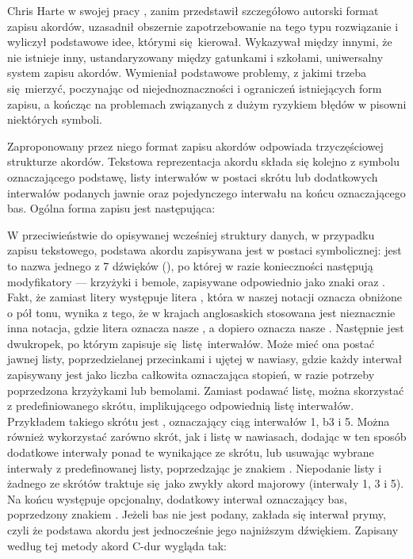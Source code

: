 Chris Harte w swojej pracy \cite{harte_towards_nodate}, zanim przedstawił szczegółowo autorski format zapisu akordów, uzasadnił obszernie zapotrzebowanie na tego typu rozwiązanie i wyliczył podstawowe idee, którymi się kierował. Wykazywał między innymi, że nie istnieje inny, ustandaryzowany między gatunkami i szkołami, uniwersalny system zapisu akordów.  Wymieniał podstawowe problemy, z jakimi trzeba się mierzyć, poczynając od niejednoznaczności i ograniczeń istniejących form zapisu, a kończąc na problemach związanych z dużym ryzykiem błędów w pisowni niektórych symboli.

Zaproponowany przez niego format zapisu akordów odpowiada trzyczęściowej strukturze akordów.  Tekstowa reprezentacja akordu składa się kolejno z symbolu oznaczającego podstawę, listy interwałów w postaci skrótu lub dodatkowych interwałów podanych jawnie oraz pojedynczego interwału na końcu oznaczającego bas. Ogólna forma zapisu jest następująca: 
\begin{center}
\end{center}
W przeciwieństwie do opisywanej wcześniej struktury danych, w przypadku zapisu tekstowego, podstawa akordu zapisywana jest w postaci symbolicznej: jest to nazwa jednego z 7 dźwięków (), po której w razie konieczności następują modyfikatory --- krzyżyki i bemole, zapisywane odpowiednio jako znaki \code{\#} oraz . Fakt, że zamiast litery  występuje litera , która w naszej notacji oznacza  obniżone o pół tonu, wynika z tego, że w krajach anglosaskich stosowana jest nieznacznie inna notacja, gdzie litera  oznacza nasze , a dopiero  oznacza nasze . Następnie jest dwukropek, po którym zapisuje się listę interwałów. Może mieć ona postać jawnej listy, poprzedzielanej przecinkami i ujętej w nawiasy, gdzie każdy interwał zapisywany jest jako liczba całkowita oznaczająca stopień, w razie potrzeby poprzedzona krzyżykami lub bemolami. Zamiast podawać listę, można skorzystać z predefiniowanego skrótu, implikującego odpowiednią listę interwałów. Przykładem takiego skrótu jest , oznaczający ciąg interwałów 1, b3 i 5. Można również wykorzystać zarówno skrót, jak i listę w nawiasach, dodając w ten sposób dodatkowe interwały ponad te wynikające ze skrótu, lub usuwając wybrane interwały z predefinowanej listy, poprzedzając je znakiem \code{*}. Niepodanie listy i żadnego ze skrótów traktuje się jako zwykły akord majorowy (interwały 1, 3 i 5). Na końcu występuje opcjonalny, dodatkowy interwał oznaczający bas, poprzedzony znakiem \code{/}. Jeżeli bas nie jest podany, zakłada się interwał prymy, czyli że podstawa akordu jest jednocześnie jego najniższym dźwiękiem. Zapisany według tej metody akord C-dur wygląda tak:
